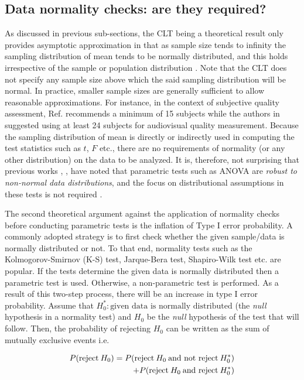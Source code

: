 \documentclass[10pt,final,Twcolumn]{IEEEtran}
\begin{document}
\subsection{Data normality checks: are they required?} \label{multiple testing}
As discussed in previous sub-sections, the CLT being a theoretical result only provides asymptotic approximation in that as sample size tends to infinity the sampling distribution of mean tends to be normally distributed, and this holds irrespective of the sample or population distribution \cite{PFLUG1983323}. Note that the CLT does not specify any sample size above which the said sampling distribution will be normal. In practice, smaller sample sizes are generally sufficient to allow reasonable approximations. For instance, in the context of subjective quality assessment, Ref. \cite{15_obs} recommends a minimum of 15 subjects while the authors in \cite{24_obs} suggested using at least 24 subjects for audiovisual quality measurement. Because the sampling distribution of mean is directly or indirectly used in computing the test statistics such as $t$, $F$ etc., there are no requirements of normality (or any other distribution) on the data to be analyzed. It is, therefore, not surprising that previous works \cite{ITURBS1534}, \cite{schmider2010}, \cite{tskewed} have noted that parametric tests such as ANOVA are {\it{robust to non-normal data distributions}}, and the focus on distributional assumptions in these tests is not required \cite{1b98f554a52645909840a63ab0bad7a3}.

The second theoretical argument against the application of normality checks before conducting parametric tests is the inflation of Type I error probability. A commonly adopted strategy is to first check whether the given sample/data is normally distributed or not. To that end, normality tests such as the Kolmogorov-Smirnov (K-S) test, Jarque-Bera test, Shapiro-Wilk test etc. are popular. If the tests determine the given data is normally distributed then a parametric test is used. Otherwise, a non-parametric test is performed. As a result of this two-step process, there will be an increase in type I error probability. Assume that $H_0^*:\text {given data is normally distributed}$ (the {\it{null}} hypothesis in a normality test) and $H_0$ be the {\it{null}} hypothesis of the test that will follow. Then, the probability of rejecting $H_0$ can be written as the sum of mutually exclusive events i.e.

\begin{align} \label{multiple_tests}
P({\text {reject}} \:H_0) = P({\text {reject}} \:H_0 {\text {\:and not reject}}\: H_0^*)   \nonumber \\ + P({\text {reject}} \:H_0 {\text {\:and reject}}\:H_0^*) 
\end{align}
\end{document}
